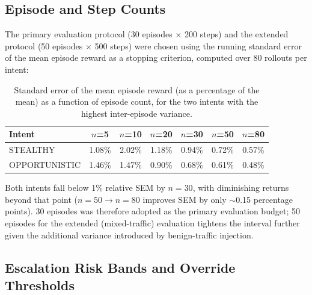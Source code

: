 \subsection{Episode and Step Counts}

The primary evaluation protocol (30 episodes $\times$ 200 steps) and the
extended protocol (50 episodes $\times$ 500 steps) were chosen using the
running standard error of the mean episode reward as a stopping criterion,
computed over 80 rollouts per intent:

\begin{table}[ht]
  \centering
  \caption{Standard error of the mean episode reward (as a percentage of
           the mean) as a function of episode count, for the two intents
           with the highest inter-episode variance.}
  \label{tab:sem_episodes}
  \begin{tabular}{lcccccc}
    \toprule
    Intent & $n$=5 & $n$=10 & $n$=20 & $n$=30 & $n$=50 & $n$=80 \\
    \midrule
    STEALTHY      & 1.08\% & 2.02\% & 1.18\% & 0.94\% & 0.72\% & 0.57\% \\
    OPPORTUNISTIC & 1.46\% & 1.47\% & 0.90\% & 0.68\% & 0.61\% & 0.48\% \\
    \bottomrule
  \end{tabular}
\end{table}

Both intents fall below 1\% relative SEM by $n=30$, with diminishing returns
beyond that point ($n=50 \to n=80$ improves SEM by only $\sim$0.15
percentage points). 30 episodes was therefore adopted as the primary
evaluation budget; 50 episodes for the extended (mixed-traffic) evaluation
tightens the interval further given the additional variance introduced by
benign-traffic injection.

\subsection{Escalation Risk Bands and Override Thresholds}

